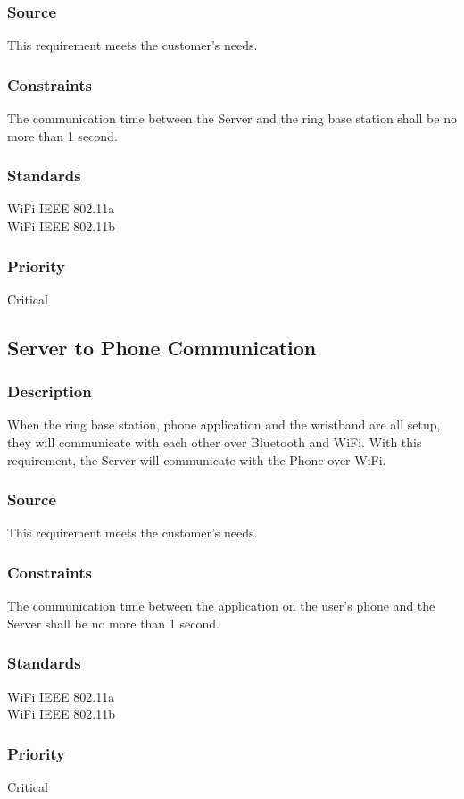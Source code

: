 \subsubsection{Source}
This requirement meets the customer's needs.
\subsubsection{Constraints}
The communication time between the Server and the ring base station shall be no more than 1 second.
\subsubsection{Standards}
WiFi IEEE 802.11a
\\WiFi IEEE 802.11b
\subsubsection{Priority}
Critical 

\subsection{Server to Phone Communication}
\subsubsection{Description}
When the ring base station, phone application and the wristband are all setup, they will communicate with each other over Bluetooth and WiFi. With this requirement, the Server will communicate with the Phone over WiFi.
\subsubsection{Source}
This requirement meets the customer's needs.
\subsubsection{Constraints}
The communication time between the application on the user's phone and the Server shall be no more than 1 second.
\subsubsection{Standards}
WiFi IEEE 802.11a
\\WiFi IEEE 802.11b
\subsubsection{Priority}
Critical 

